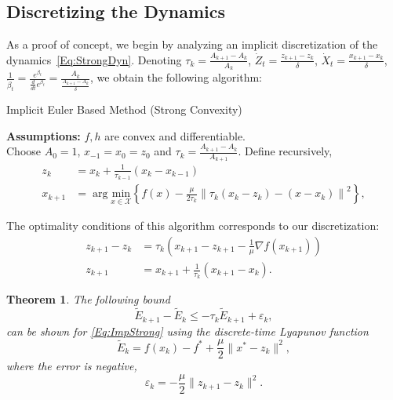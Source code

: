 \documentclass[11pt]{article}
\theoremstyle{plain}
\newtheorem{theorem}{Theorem}
\newcommand{\X}{{\mathcal X}}
\begin{document}
\subsection{Discretizing the Dynamics}
As a proof of concept, we begin by analyzing an implicit discretization of the dynamics~\eqref{Eq:StrongDyn}. 
Denoting  $\tau_k = \frac{A_{k+1} - A_k}{A_k}$, $\dot Z_t = \frac{z_{k+1} - z_k}{\delta}$, $\dot X_t = \frac{x_{k+1} - x_k}{\delta}$, $\frac{1}{\dot \beta_t} = \frac{e^{\beta_t}}{\frac{d}{dt} e^{\beta_t}} = \frac{A_{k}}{\frac{A_{k+1} - A_k}{\delta}}$, 
we obtain the following algorithm:
\begin{algorithm}[H]
\caption{Implicit Euler Based Method (Strong Convexity)}
{\bf Assumptions:} $f, h$ are convex and differentiable.\\
Choose $A_0 = 1$, $x_{-1}=x_0 = z_0$ and $\tau_{k} = \frac{A_{k+1} - A_k}{A_{k+1}}$. Define recursively,
\begin{subequations}
\begin{align}\label{Eq:AlgoForward}
z_{k} &= x_{k} + \frac{1}{\tau_{k-1}}(x_{k} - x_{k-1})\\
x_{k+1} &= \arg\underset{x\in\X}{\text{min}} \left\{ f(x) - \frac{\mu}{2\tau_k}\left\|\tau_k(x_k - z_k) - (x - x_k)\right\|^2\right\},
\end{align}
\end{subequations}
\end{algorithm}
\noindent The optimality conditions of this algorithm corresponds to our discretization: 
\begin{subequations}\label{Eq:ImpStrong}
\begin{align}
z_{k+1} - z_k &= \tau_k \left( x_{k+1} - z_{k+1} - \frac{1}{\mu} \nabla f(x_{k+1})\right) \label{Eq:ZImpStrong}\\
z_{k+1} &= x_{k+1} + \frac{1}{\tau_k}(x_{k+1} - x_k)\label{Eq:ImpStrong}.
\end{align}
\end{subequations}
\begin{theorem}
The following bound
\begin{equation*}
\tilde E_{k+1} -\tilde E_k \leq - \tau_k \tilde E_{k+1} + \varepsilon_k,
\end{equation*}
can be shown for \eqref{Eq:ImpStrong} using the discrete-time Lyapunov function
\begin{equation}
\tilde E_k = f(x_k) - f^\ast + \frac{\mu}{2}\|x^\ast- z_k\|^2,
\end{equation}
where the error is negative,
\begin{equation*}
\varepsilon_k = - \frac{\mu}{2} \|z_{k+1} - z_k\|^2.
\end{equation*}
\end{theorem}
\end{document}
